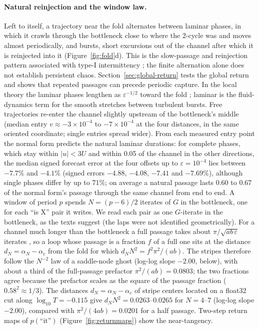 \documentclass[11pt,letterpaper]{article}
\newcommand{\eps}{\varepsilon}
\begin{document}
\paragraph{Natural reinjection and the window law.} Left to itself, a trajectory near the fold alternates between
laminar phases, in which it crawls through the bottleneck close to where the 2-cycle was and moves almost
periodically, and bursts, short excursions out of the channel after which it is reinjected into it
(Figure~\ref{fig:fold}d). This is the slow-passage and reinjection pattern associated with type-I intermittency \cite{pomeau1980intermittent};
the finite alternation alone does not establish persistent chaos. Section~\ref{sec:global-return} tests the global
return and shows that repeated passages can precede periodic capture. In the local theory the laminar phases lengthen as
$\eps^{-1/2}$ toward the fold \cite{hirsch1982theory};
laminar is the fluid-dynamics term for the smooth stretches between turbulent bursts. Free trajectories re-enter the
channel slightly upstream of the bottleneck's middle (median entry $v\approx-3\times10^{-4}$ to $-7\times10^{-4}$ at the
four distances, in the same oriented coordinate; single entries spread wider). From each measured entry point the normal form predicts the natural laminar durations: for complete phases, which stay
within $|u|<3U$ and within 0.05 of the channel in the other directions, the median signed forecast error at the four
offsets up to $\eps=10^{-4}$ lies between $-7.7\%$ and $-4.1\%$ (signed errors $-4.88$, $-4.08$, $-7.41$ and
$-7.69\%$), although single phases differ by up to 71\%; on average a natural passage lasts 0.60 to 0.67 of the normal
form's passage through the same channel from end to end. A window of
period $p$ spends $N=(p-6)/2$ iterates of $G$ in the bottleneck, one for each ``is X'' pair it writes. We read each pair as one $G$-iterate in the bottleneck, as the texts suggest (the laps were not identified
geometrically). For a channel much longer than the bottleneck a full passage takes about $\pi/\sqrt{ab\,\eps}$ iterates
\cite{hirsch1982theory,strogatz1989predicted}, so a loop whose passage is
a fraction $f$ of a full one sits at the distance $d_N=\alpha_N-\alpha_c$ from the fold for which
$d_NN^2=f^2\pi^2/(ab)$. The stripes therefore follow the $N^{-2}$ law of a saddle-node ghost
\cite{strogatz1989predicted,strogatz2018nonlinear} (log-log slope $-2.00$, below), with about a third of the
full-passage prefactor $\pi^2/(ab)=0.0803$; the two fractions agree because the prefactor scales as the square of the passage
fraction ($0.58^2\approx1/3$). The distances $d_N=\alpha_N-\alpha_c$ of stripe centers located on a float32 cut along
$\log_{10}T=-0.115$ give $d_N N^2=0.0263$--$0.0265$ for $N=4$--$7$ (log-log slope $-2.00$), compared with $\pi^2/(4ab)=0.0201$ for a half passage. Two-step return maps of $p(\text{``it''})$ (Figure~\ref{fig:returnmaps}) show the near-tangency.
\end{document}
